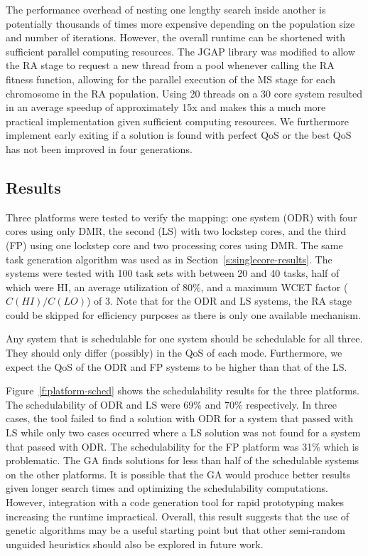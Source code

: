 	The performance overhead of nesting one lengthy search inside another is potentially thousands of times more expensive depending on the population size and number of iterations.
	However, the overall runtime can be shortened with sufficient parallel computing resources. 
	The JGAP library was modified to allow the RA stage to request a new thread from a pool whenever calling the RA fitness function, allowing for the parallel execution of the MS stage for each chromosome in the RA population.
	Using 20 threads on a 30 core system resulted in an average speedup of approximately 15x and makes this a much more practical implementation given sufficient computing resources. 
	We furthermore implement early exiting if a solution is found with perfect QoS or the best QoS has not been improved in four generations.

\subsection{Results}


	Three platforms were tested to verify the mapping: one system (ODR) with four cores using only DMR, the second (LS) with two lockstep cores, and the third (FP) using one lockstep core and two processing cores using DMR. 
	The same task generation algorithm was used as in Section~\ref{s:singlecore-results}. 
	The systems were tested with 100 task sets with between 20 and 40 tasks, half of which were HI, an average utilization of 80\%, and a maximum WCET factor ($C(HI)/C(LO)$) of 3. 
	Note that for the ODR and LS systems, the RA stage could be skipped for efficiency purposes as there is only one available mechanism.

	Any system that is schedulable for one system should be schedulable for all three. 
	They should only differ (possibly) in the QoS of each mode. 
	Furthermore, we expect the QoS of the ODR and FP systems to be higher than that of the LS.  

	Figure~\ref{f:platform-sched} shows the schedulability results for the three platforms. 
	The schedulability of ODR and LS were 69\% and 70\% respectively. 
	In three cases, the tool failed to find a solution with ODR for a system that passed with LS while only two cases occurred where a LS solution was not found for a system that passed with ODR. 
	The schedulability for the FP platform was 31\% which is problematic. 
	The GA finds solutions for less than half of the schedulable systems on the other platforms.
	It is possible that the GA would produce better results given longer search times and optimizing the schedulability computations. 
	However, integration with a code generation tool for rapid prototyping makes increasing the runtime impractical. 
	Overall, this result suggests that the use of genetic algorithms may be a useful starting point but that other semi-random unguided heuristics should also be explored in future work.
	
